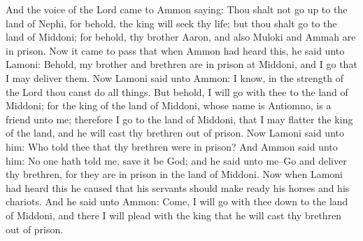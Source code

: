 And the voice of the Lord came to Ammon saying: Thou shalt not go up to the land of Nephi, for behold, the king will seek thy life; but thou shalt go to the land of Middoni; for behold, thy brother Aaron, and also Muloki and Ammah are in prison.
\bverse \iffalse Now it came to pass that when Ammon had heard this, he said unto Lamoni: Behold, my brother and brethren are in prison at Middoni, and I go that I may deliver them. \fi
Now it came to pass that when Ammon had heard this, he said unto Lamoni: Behold, my brother and brethren are in prison at Middoni, and I go that I may deliver them.
\bverse \iffalse Now Lamoni said unto Ammon: I know, in the strength of the Lord thou canst do all things. But behold, I will go with thee to the land of Middoni; for the king of the land of Middoni, whose name is Antiomno, is a friend unto me; therefore I go to the land of Middoni, that I may flatter the king of the land, and he will cast thy brethren out of prison. Now Lamoni said unto him: Who told thee that thy brethren were in prison? \fi
Now Lamoni said unto Ammon: I know, in the strength of the Lord thou canst do all things. But behold, I will go with thee to the land of Middoni; for the king of the land of Middoni, whose name is Antiomno, is a friend unto me; therefore I go to the land of Middoni, that I may flatter the king of the land, and he will cast thy brethren out of prison. Now Lamoni said unto him: Who told thee that thy brethren were in prison?
\bverse \iffalse And Ammon said unto him: No one hath told me, save it be God; and he said unto me--Go and deliver thy brethren, for they are in prison in the land of Middoni. \fi
And Ammon said unto him: No one hath told me, save it be God; and he said unto me--Go and deliver thy brethren, for they are in prison in the land of Middoni.
\bverse \iffalse Now when Lamoni had heard this he caused that his servants should make ready his horses and his chariots. \fi
Now when Lamoni had heard this he caused that his servants should make ready his horses and his chariots.
\bverse \iffalse And he said unto Ammon: Come, I will go with thee down to the land of Middoni, and there I will plead with the king that he will cast thy brethren out of prison. \fi
And he said unto Ammon: Come, I will go with thee down to the land of Middoni, and there I will plead with the king that he will cast thy brethren out of prison.
\bverse \iffalse And it came to pass that as Ammon and Lamoni were journeying thither, they met the father of Lamoni, who was king over all the land. \fi
